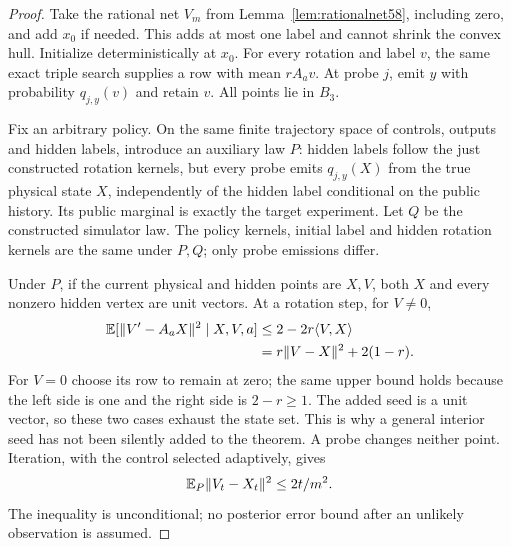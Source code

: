 \begin{proof}
Take the rational net $V_m$ from Lemma~\ref{lem:rationalnet58}, including
zero, and add $x_0$ if needed. This adds at most one label and cannot
shrink the convex hull. Initialize deterministically at $x_0$. For every
rotation and label $v$, the same exact triple search supplies a row with
mean $rA_av$. At probe $j$, emit $y$ with probability $q_{j,y}(v)$ and
retain $v$. All points lie in $B_3$.

Fix an arbitrary policy. On the same finite trajectory space of controls,
outputs and hidden labels, introduce an auxiliary law $P$: hidden labels
follow the just constructed rotation kernels, but every probe emits
$q_{j,y}(X)$ from the true physical state $X$, independently of the
hidden label conditional on the public history. Its public marginal is
exactly the target experiment. Let $Q$ be the constructed simulator law.
The policy kernels, initial label and hidden rotation kernels are the
same under $P,Q$; only probe emissions differ.

Under $P$, if the current physical and hidden points are $X,V$, both
$X$ and every nonzero hidden vertex are unit vectors. At a rotation
step, for $V\ne0$,
\begin{align*}
 \mathbb E[\lVert V'-A_aX\rVert^2\mid X,V,a]
 &\le 2-2r\langle V,X\rangle\\
 &=r\lVert V-X\rVert^2+2(1-r).
\end{align*}
For $V=0$ choose its row to remain at zero; the same upper bound holds
because the left side is one and the right side is $2-r\ge1$.
The added seed is a unit vector, so these two cases exhaust the state
set. This is why a general interior seed has not been silently added
to the theorem. A probe changes neither point. Iteration, with the
control selected adaptively, gives
\begin{equation}\label{eq:processmoment59}
                  \mathbb E_P\lVert V_t-X_t\rVert^2\le 2t/m^2.
\end{equation}
The inequality is unconditional; no posterior error bound after an
unlikely observation is assumed.


\end{proof}
